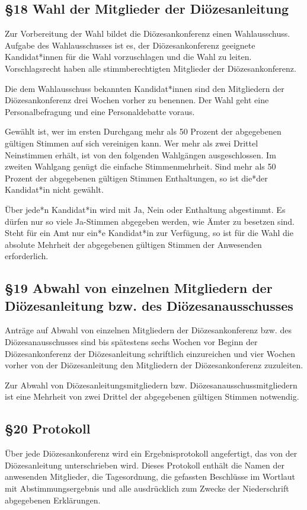 \documentclass[12pt]{report}
\begin{document}
\begin{flushleft}
\subsection*{§18 Wahl der Mitglieder der Diözesanleitung}
Zur Vorbereitung der Wahl bildet die Diözesankonferenz einen Wahlausschuss. Aufgabe des Wahlausschusses
ist es, der Diözesankonferenz geeignete Kandidat*innen für die Wahl vorzuschlagen und die Wahl zu leiten.
Vorschlagsrecht haben alle stimmberechtigten Mitglieder der Diözesankonferenz.

Die dem Wahlausschuss bekannten Kandidat*innen sind den Mitgliedern der Diözesankonferenz drei Wochen
vorher zu benennen. Der Wahl geht eine Personalbefragung und eine Personaldebatte voraus.

Gewählt ist, wer im ersten Durchgang mehr als 50 Prozent der abgegebenen gültigen Stimmen auf sich 
vereinigen kann. Wer mehr als zwei Drittel Neinstimmen erhält, ist von den folgenden Wahlgängen ausgeschlossen. 
Im zweiten Wahlgang genügt die einfache Stimmenmehrheit. Sind mehr als 50 Prozent der abgegebenen
gültigen Stimmen Enthaltungen, so ist die*der Kandidat*in nicht gewählt.

Über jede*n Kandidat*in wird mit Ja, Nein oder Enthaltung abgestimmt. Es dürfen nur so viele Ja-Stimmen
abgegeben werden, wie Ämter zu besetzen sind. Steht für ein Amt nur ein*e Kandidat*in zur Verfügung, so ist für
die Wahl die absolute Mehrheit der abgegebenen gültigen Stimmen der Anwesenden erforderlich.

\subsection*{§19 Abwahl von einzelnen Mitgliedern der Diözesanleitung bzw. des Diözesanausschusses}
Anträge auf Abwahl von einzelnen Mitgliedern der Diözesankonferenz bzw. des Diözesanausschusses sind
bis spätestens sechs Wochen vor Beginn der Diözesankonferenz der Diözesanleitung schriftlich einzureichen
und vier Wochen vorher von der Diözesanleitung den Mitgliedern der Diözesankonferenz zuzuleiten.

Zur Abwahl von Diözesanleitungsmitgliedern bzw. Diözesanausschussmitgliedern ist eine Mehrheit von zwei
Drittel der abgegebenen gültigen Stimmen notwendig.

\subsection*{§20 Protokoll}
Über jede Diözesankonferenz wird ein Ergebnisprotokoll angefertigt, das von der Diözesanleitung 
unterschrieben wird. Dieses Protokoll enthält die Namen der anwesenden Mitglieder, die Tagesordnung,
die gefassten Beschlüsse im Wortlaut mit Abstimmungsergebnis und alle ausdrücklich zum Zwecke der 
Niederschrift abgegebenen Erklärungen.

\end{flushleft}
\end{document}
